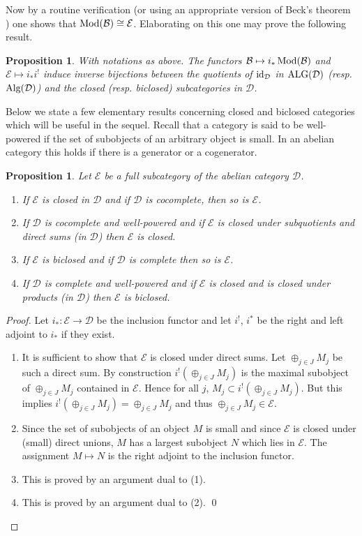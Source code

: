 \documentclass{amsproc}
\def\Bscr{{\mathcal B}}
\def\Dscr{{\mathcal D}}
\def\Escr{{\mathcal E}}
\def\Id{\text{id}}
\def\Mod{\mathop{\text{Mod}}}
\def\Alg{\mathop{\text{Alg}}}
\def\ALG{\mathop{\text{ALG}}}
\def\r{\rightarrow}
\let\oldtext\text
\def\text#1{\oldtext{\upshape #1}}
\newtheorem{propositions}[lemmas]{Proposition}
\theoremstyle{definition}
\theoremstyle{remark}
\numberwithin{equation}{section}
\numberwithin{table}{section}
\numberwithin{figure}{section}
\begin{document}
Now by a routine verification (or using an appropriate version of
Beck's theorem \cite{ML}) one shows that $\Mod(\Bscr)\cong
\Escr$. Elaborating on this one may prove the following result.
\begin{propositions}
\label{ref:3.4.2a}
 With notations as above. The functors $\Bscr\mapsto i_\ast
\Mod(\Bscr)$ and $\Escr \mapsto i_\ast i^!$ induce inverse bijections between
the quotients of $\Id_\Dscr$ in $\ALG(\Dscr)$ (resp.\ $\Alg(\Dscr)$) and the
closed (resp. biclosed) subcategories in $\Dscr$.
\end{propositions}
Below we state a few elementary results concerning closed and biclosed
categories which will be useful in the sequel. Recall that a category
is said to be well-powered if the set of subobjects of an arbitrary
object is
small. In an abelian category this holds if there is a generator or a
cogenerator. 
\begin{propositions} 
\label{ref:3.4.3a}
Let $\Escr$ be a full subcategory of the abelian category
$\Dscr$.
\begin{enumerate}
\item If $\Escr$ is closed in $\Dscr$ and if $\Dscr$ is cocomplete,
  then so is $\Escr$.
\item
If $\Dscr$ is cocomplete and well-powered and if $\Escr$ is closed under
subquotients and direct sums (in $\Dscr$) then $\Escr$ is closed.
\item If $\Escr$ is biclosed and if $\Dscr$ is complete then so is 
$\Escr$.
\item
If $\Dscr$ is complete and well-powered and if $\Escr$ is closed
 and is closed under products  (in $\Dscr$) then $\Escr$ is biclosed.
\end{enumerate}
\end{propositions}
\begin{proof}
Let $i_\ast:\Escr\r\Dscr$ be the inclusion functor and let $i^!$, $i^\ast$ be
the right and left adjoint to $i_\ast$ if they exist.
\begin{enumerate}
\item
It is sufficient to show that $\Escr$ is closed under direct
sums. Let $\oplus_{j\in J} M_j$ be such a direct sum. By
construction $i^!(\oplus_{j\in J} M_j)$ is the maximal subobject of
$\oplus_{j\in J} M_j$ contained in $\Escr$. Hence for all $j$,
$M_j\subset i^!(\oplus_{j\in J} M_j)$. But this implies $i^!(\oplus_{j\in J}
M_j)=\oplus_{j\in J} M_j$ and thus $\oplus _{j\in J} M_j\in \Escr$.
\item Since the set of subobjects of an object $M$ is small and since
  $\Escr$ is closed under (small) direct unions, $M$ has a largest subobject
  $N$ which lies in $\Escr$. The assignment $M\mapsto N$ is the right
  adjoint to the inclusion functor.
\item This is proved by an argument dual to (1).
\item This is proved by an argument dual to (2). \qed
\end{enumerate}
\def\qed{}
\end{proof}
\end{document}
